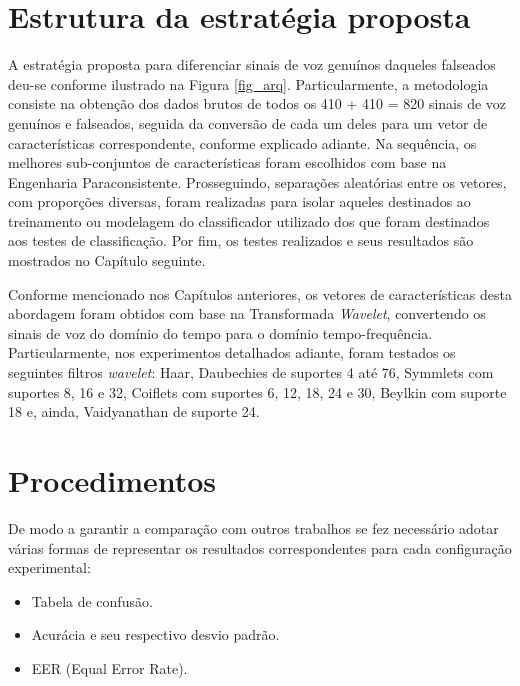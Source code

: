 	\section{Estrutura da estratégia proposta}
		\par A estratégia proposta para diferenciar sinais de voz genuínos daqueles falseados deu-se conforme ilustrado na Figura \ref{fig_arq}. Particularmente, a metodologia consiste na obtenção dos dados brutos de todos os 410 + 410 = 820 sinais de voz genuínos e falseados, seguida da conversão de cada um deles para um vetor de características correspondente, conforme explicado adiante. Na sequência, os melhores sub-conjuntos de características foram escolhidos com base na Engenharia Paraconsistente. Prosseguindo, separações aleatórias entre os vetores, com proporções diversas, foram realizadas para isolar aqueles destinados ao treinamento ou modelagem do classificador utilizado dos que foram destinados aos testes de classificação. Por fim, os testes realizados e seus resultados são mostrados no Capítulo seguinte.
		
		
		
		\par Conforme mencionado nos Capítulos anteriores, os vetores de características desta abordagem foram obtidos com base na Transformada \textit{Wavelet}, convertendo os sinais de voz do domínio do tempo para o domínio tempo-frequência. Particularmente, nos experimentos detalhados adiante, foram testados os seguintes filtros \textit{wavelet}: Haar, Daubechies de suportes 4 até 76, Symmlets com suportes 8, 16 e 32, Coiflets com suportes 6, 12, 18, 24 e 30, Beylkin com suporte 18 e, ainda, Vaidyanathan de suporte 24.

	\section{Procedimentos}
		\par De modo a garantir a comparação com outros trabalhos se fez necessário adotar várias formas de representar os resultados correspondentes para cada configuração experimental:\\
		\begin{itemize}
			\item Tabela de confusão.
			\item Acurácia e seu respectivo desvio padrão.
			\item EER (Equal Error Rate).
		\end{itemize}
		
